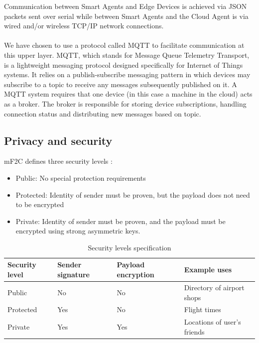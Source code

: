 Communication between Smart Agents and Edge Devices is achieved via JSON packets sent over serial while between Smart Agents and the Cloud Agent is via wired and/or wireless TCP/IP network connections.

\paragraph{}
We have chosen to use a protocol called MQTT to facilitate communication at this upper layer. MQTT, which stands for Message Queue Telemetry Transport, is a lightweight messaging protocol designed specifically for Internet of Things systems. It relies on a publish-subscribe messaging pattern in which devices may subscribe to a topic to receive any messages subsequently published on it. A MQTT system requires that one device (in this case a machine in the cloud) acts as a broker. The broker is responsible for storing device subscriptions, handling connection status and distributing new messages based on topic.

\subsection{Privacy and security}

mF2C defines three security levels \cite{mf2cwebsite}:

\begin{itemize}
    \item Public: No special protection requirements
    \item Protected: Identity of sender must be proven, but the payload does not need to be encrypted
    \item Private: Identity of sender must be proven, and the payload must be encrypted using strong asymmetric keys.
\end{itemize}

\begin{table}[h!]
    \begin{center}
        \begin{tabular}{ |p{2cm}|p{3cm}|p{3cm}|p{4cm}| }
            \hline
            Security level & Sender signature & Payload encryption & Example uses \\ \hline
            Public & No & No & Directory of airport shops \\ \hline
            Protected & Yes & No & Flight times \\ \hline
            Private & Yes & Yes & Locations of user's friends \\
            \hline
        \end{tabular}
        \caption{Security levels specification}
        \label{table:secure_levels}
    \end{center}
\end{table}

